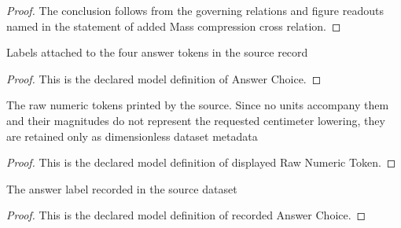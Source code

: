 \begin{proof}
  The conclusion follows from the governing relations and figure readouts named in the statement of added Mass compression cross relation.
\end{proof}
\begin{definition}
  \label{def:physics:phyx-mini-0199:phyxminiproblems-problemphyxmini0199-answerchoice}
  Labels attached to the four answer tokens in the source record
\end{definition}
\begin{proof}
  This is the declared model definition of Answer Choice.
\end{proof}
\begin{definition}
  \label{def:physics:phyx-mini-0199:phyxminiproblems-problemphyxmini0199-displayedrawnumerictoken}
  The raw numeric tokens printed by the source. Since no units accompany them and their magnitudes do not represent the requested centimeter lowering, they are retained only as dimensionless dataset metadata
\end{definition}
\begin{proof}
  This is the declared model definition of displayed Raw Numeric Token.
\end{proof}
\begin{definition}
  \label{def:physics:phyx-mini-0199:phyxminiproblems-problemphyxmini0199-recordedanswerchoice}
  The answer label recorded in the source dataset
\end{definition}
\begin{proof}
  This is the declared model definition of recorded Answer Choice.
\end{proof}
